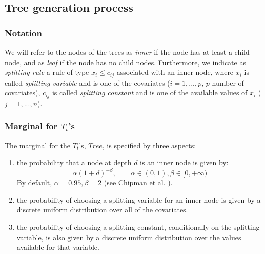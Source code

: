 \documentclass[11pt,a4paper]{article}
\begin{document}
\subsection{Tree generation process}
\subsubsection{Notation}
We will refer to the nodes of the trees as \textit{inner} if the node has at least a child node, and as \textit{leaf} if the node has no child nodes. Furthermore, we indicate as \textit{splitting rule} a rule of type $x_{i} \le c_{ij}$ associated with an inner node, where $x_{i}$ is called \textit{splitting variable} and is one of the covariates ($i = 1, ..., p$, $p$ number of covariates), $c_{ij}$ is called \textit{splitting constant} and is one of the available values of $x_i$ ($j = 1,...,n$).

\newpage

\subsubsection{Marginal for $T_t$'s}
\label{sec:TreeMarginal}
The marginal for the $T_t$'s, $Tree$, is specified by three aspects:
\begin{enumerate}
    \item the probability that a node at depth $d$ is an inner node is given by: $$\alpha(1+d)^{-\beta}, \qquad \alpha \in (0,1), \beta \in [0, +\infty)$$
          By default, $\alpha = 0.95, \beta = 2$ (see Chipman et al. \cite{Chipman_2010}).
    \item the probability of choosing a splitting variable for an inner node is given by a discrete uniform distribution over all of the covariates.
    \item the probability of choosing a splitting constant, conditionally on the splitting variable, is also given by a discrete uniform distribution over the values available for that variable.
\end{enumerate}
\end{document}
